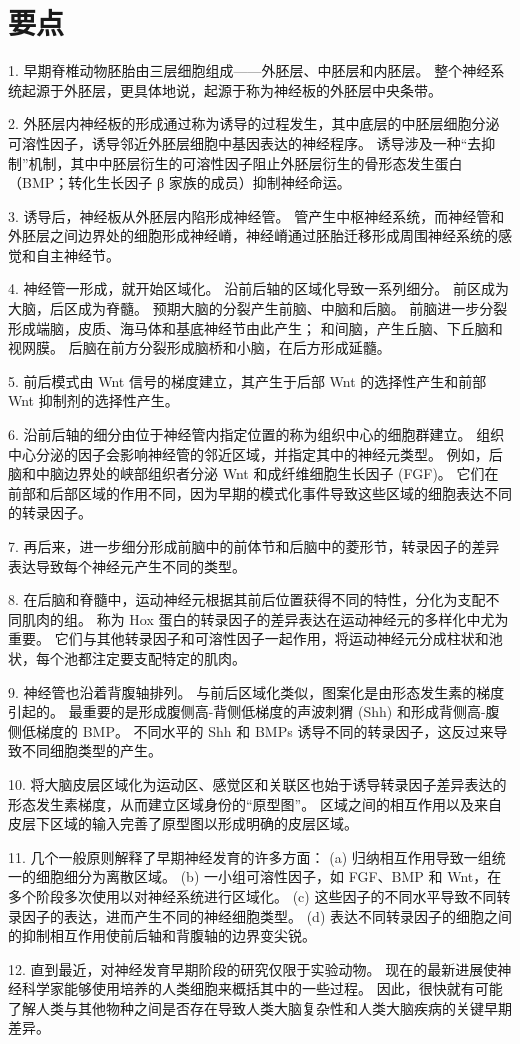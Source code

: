 \section{要点}

1. 早期脊椎动物胚胎由三层细胞组成——外胚层、中胚层和内胚层。
整个神经系统起源于外胚层，更具体地说，起源于称为神经板的外胚层中央条带。 


2. 外胚层内神经板的形成通过称为诱导的过程发生，其中底层的中胚层细胞分泌可溶性因子，诱导邻近外胚层细胞中基因表达的神经程序。
诱导涉及一种“去抑制”机制，其中中胚层衍生的可溶性因子阻止外胚层衍生的骨形态发生蛋白（BMP；转化生长因子 β 家族的成员）抑制神经命运。 


3. 诱导后，神经板从外胚层内陷形成神经管。
管产生中枢神经系统，而神经管和外胚层之间边界处的细胞形成神经嵴，神经嵴通过胚胎迁移形成周围神经系统的感觉和自主神经节。


4. 神经管一形成，就开始区域化。
沿前后轴的区域化导致一系列细分。
前区成为大脑，后区成为脊髓。 预期大脑的分裂产生前脑、中脑和后脑。
前脑进一步分裂形成端脑，皮质、海马体和基底神经节由此产生；
和间脑，产生丘脑、下丘脑和视网膜。
后脑在前方分裂形成脑桥和小脑，在后方形成延髓。


5. 前后模式由 Wnt 信号的梯度建立，其产生于后部 Wnt 的选择性产生和前部 Wnt 抑制剂的选择性产生。 


6. 沿前后轴的细分由位于神经管内指定位置的称为组织中心的细胞群建立。
组织中心分泌的因子会影响神经管的邻近区域，并指定其中的神经元类型。
例如，后脑和中脑边界处的峡部组织者分泌 Wnt 和成纤维细胞生长因子 (FGF)。
它们在前部和后部区域的作用不同，因为早期的模式化事件导致这些区域的细胞表达不同的转录因子。


7. 再后来，进一步细分形成前脑中的前体节和后脑中的菱形节，转录因子的差异表达导致每个神经元产生不同的类型。 


8. 在后脑和脊髓中，运动神经元根据其前后位置获得不同的特性，分化为支配不同肌肉的组。
称为 Hox 蛋白的转录因子的差异表达在运动神经元的多样化中尤为重要。
它们与其他转录因子和可溶性因子一起作用，将运动神经元分成柱状和池状，每个池都注定要支配特定的肌肉。 


9. 神经管也沿着背腹轴排列。
与前后区域化类似，图案化是由形态发生素的梯度引起的。
最重要的是形成腹侧高-背侧低梯度的声波刺猬 (Shh) 和形成背侧高-腹侧低梯度的 BMP。
不同水平的 Shh 和 BMPs 诱导不同的转录因子，这反过来导致不同细胞类型的产生。 


10. 将大脑皮层区域化为运动区、感觉区和关联区也始于诱导转录因子差异表达的形态发生素梯度，从而建立区域身份的“原型图”。
区域之间的相互作用以及来自皮层下区域的输入完善了原型图以形成明确的皮层区域。 


11. 几个一般原则解释了早期神经发育的许多方面： 
(a) 归纳相互作用导致一组统一的细胞细分为离散区域。
(b) 一小组可溶性因子，如 FGF、BMP 和 Wnt，在多个阶段多次使用以对神经系统进行区域化。
(c) 这些因子的不同水平导致不同转录因子的表达，进而产生不同的神经细胞类型。
(d) 表达不同转录因子的细胞之间的抑制相互作用使前后轴和背腹轴的边界变尖锐。


12. 直到最近，对神经发育早期阶段的研究仅限于实验动物。
现在的最新进展使神经科学家能够使用培养的人类细胞来概括其中的一些过程。
因此，很快就有可能了解人类与其他物种之间是否存在导致人类大脑复杂性和人类大脑疾病的关键早期差异。


